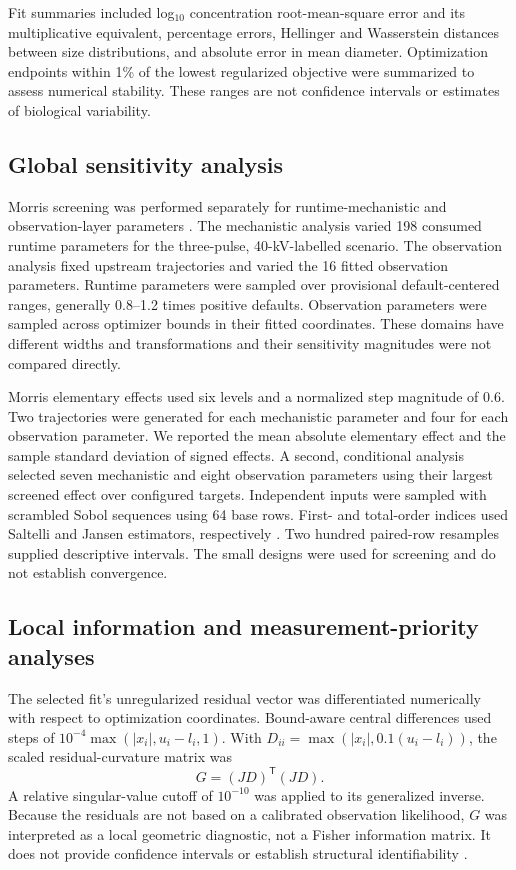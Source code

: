 Fit summaries included log$_{10}$ concentration root-mean-square error and its multiplicative equivalent, percentage errors, Hellinger and Wasserstein distances between size distributions, and absolute error in mean diameter. Optimization endpoints within 1\% of the lowest regularized objective were summarized to assess numerical stability. These ranges are not confidence intervals or estimates of biological variability.

\subsection*{Global sensitivity analysis}

Morris screening was performed separately for runtime-mechanistic and observation-layer parameters \cite{morris1991factorial}. The mechanistic analysis varied 198 consumed runtime parameters for the three-pulse, 40-kV-labelled scenario. The observation analysis fixed upstream trajectories and varied the 16 fitted observation parameters. Runtime parameters were sampled over provisional default-centered ranges, generally 0.8--1.2 times positive defaults. Observation parameters were sampled across optimizer bounds in their fitted coordinates. These domains have different widths and transformations and their sensitivity magnitudes were not compared directly.

Morris elementary effects used six levels and a normalized step magnitude of 0.6. Two trajectories were generated for each mechanistic parameter and four for each observation parameter. We reported the mean absolute elementary effect and the sample standard deviation of signed effects. A second, conditional analysis selected seven mechanistic and eight observation parameters using their largest screened effect over configured targets. Independent inputs were sampled with scrambled Sobol sequences using 64 base rows. First- and total-order indices used Saltelli and Jansen estimators, respectively \cite{saltelli2010variance,jansen1999analysis}. Two hundred paired-row resamples supplied descriptive intervals. The small designs were used for screening and do not establish convergence.

\subsection*{Local information and measurement-priority analyses}

The selected fit's unregularized residual vector was differentiated numerically with respect to optimization coordinates. Bound-aware central differences used steps of $10^{-4}\max(|x_i|,u_i-l_i,1)$. With $D_{ii}=\max(|x_i|,0.1(u_i-l_i))$, the scaled residual-curvature matrix was
\begin{equation}
G=(JD)^{\mathsf T}(JD).
\end{equation}
A relative singular-value cutoff of $10^{-10}$ was applied to its generalized inverse. Because the residuals are not based on a calibrated observation likelihood, $G$ was interpreted as a local geometric diagnostic, not a Fisher information matrix. It does not provide confidence intervals or establish structural identifiability \cite{raue2009structural}.


